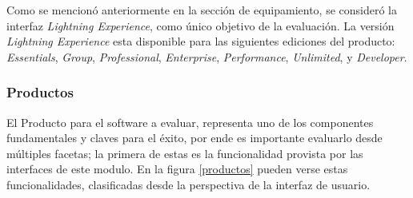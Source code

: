 Como se mencionó anteriormente en la sección de equipamiento, se consideró la
interfaz \emph{Lightning Experience}, como único objetivo de la evaluación. La
versión \emph{Lightning Experience} esta disponible para las siguientes
ediciones del producto: \emph{Essentials}, \emph{Group}, \emph{Professional},
\emph{Enterprise}, \emph{Performance}, \emph{Unlimited}, y \emph{Developer}.

\subsubsection{Productos}
El Producto para el software a evaluar, representa uno de los componentes
fundamentales y claves para el éxito, por ende es importante evaluarlo
desde múltiples facetas; la primera de estas es la funcionalidad provista por
las interfaces de este modulo. En la figura \ref{productos} pueden verse estas
funcionalidades, clasificadas desde la perspectiva de la interfaz de usuario.

